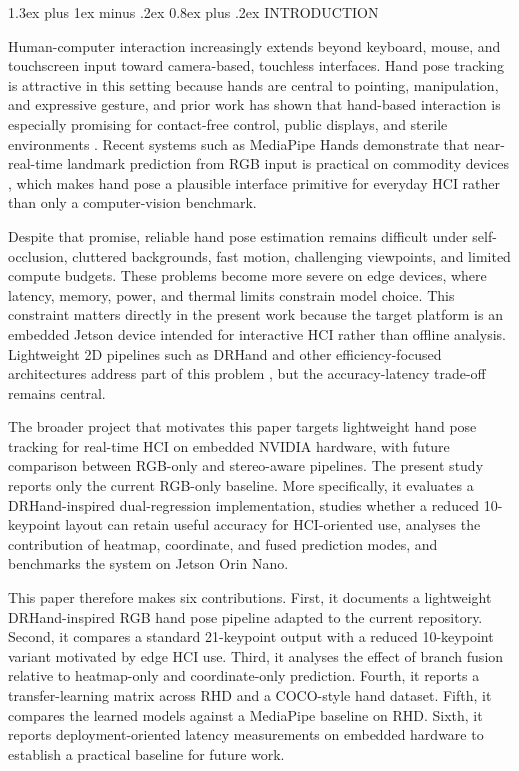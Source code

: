 \documentclass[10pt,letterpaper,twocolumn]{article}
\makeatletter
\renewcommand\section{\@startsection{section}{1}{\z@}%
  {1.3ex plus 1ex minus .2ex}%
  {0.8ex plus .2ex}%
  {\centering\normalfont\small\scshape}}
\makeatother
\begin{document}
\section{INTRODUCTION}

Human-computer interaction increasingly extends beyond keyboard, mouse, and touchscreen input toward camera-based, touchless interfaces. Hand pose tracking is attractive in this setting because hands are central to pointing, manipulation, and expressive gesture, and prior work has shown that hand-based interaction is especially promising for contact-free control, public displays, and sterile environments \cite{vuletic,wachs,li_vr}. Recent systems such as MediaPipe Hands demonstrate that near-real-time landmark prediction from RGB input is practical on commodity devices \cite{mediapipe}, which makes hand pose a plausible interface primitive for everyday HCI rather than only a computer-vision benchmark.

Despite that promise, reliable hand pose estimation remains difficult under self-occlusion, cluttered backgrounds, fast motion, challenging viewpoints, and limited compute budgets. These problems become more severe on edge devices, where latency, memory, power, and thermal limits constrain model choice. This constraint matters directly in the present work because the target platform is an embedded Jetson device intended for interactive HCI rather than offline analysis. Lightweight 2D pipelines such as DRHand and other efficiency-focused architectures address part of this problem \cite{dualreg,srhandnet,fasthand,attentionlite}, but the accuracy-latency trade-off remains central.

The broader project that motivates this paper targets lightweight hand pose tracking for real-time HCI on embedded NVIDIA hardware, with future comparison between RGB-only and stereo-aware pipelines. The present study reports only the current RGB-only baseline. More specifically, it evaluates a DRHand-inspired dual-regression implementation, studies whether a reduced 10-keypoint layout can retain useful accuracy for HCI-oriented use, analyses the contribution of heatmap, coordinate, and fused prediction modes, and benchmarks the system on Jetson Orin Nano.

This paper therefore makes six contributions. First, it documents a lightweight DRHand-inspired RGB hand pose pipeline adapted to the current repository. Second, it compares a standard 21-keypoint output with a reduced 10-keypoint variant motivated by edge HCI use. Third, it analyses the effect of branch fusion relative to heatmap-only and coordinate-only prediction. Fourth, it reports a transfer-learning matrix across RHD and a COCO-style hand dataset. Fifth, it compares the learned models against a MediaPipe baseline on RHD. Sixth, it reports deployment-oriented latency measurements on embedded hardware to establish a practical baseline for future work.
\end{document}
